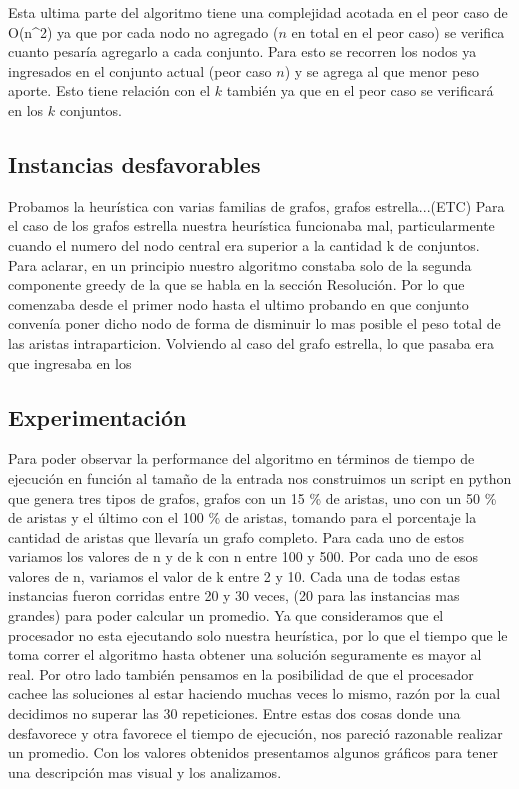Esta ultima parte del algoritmo tiene una complejidad acotada en el peor caso de O(n^2) ya que por cada nodo no agregado ($n$ en total en el peor caso) se verifica cuanto pesaría agregarlo a cada conjunto. Para esto se recorren los nodos ya ingresados en el conjunto actual (peor caso $n$) y se agrega al que menor peso aporte. Esto tiene relación con el $k$ también ya que en el peor caso se verificará en los $k$ conjuntos.

\subsection{Instancias desfavorables}


Probamos la heurística con varias familias de grafos, grafos estrella...(ETC) 
Para el caso de los grafos estrella nuestra heurística funcionaba mal, particularmente cuando el numero del nodo central era superior a la cantidad k de conjuntos. 
Para aclarar, en un principio nuestro algoritmo constaba solo de la segunda componente greedy de la que se habla en la sección Resolución. Por lo que comenzaba desde el primer nodo hasta el ultimo probando en que conjunto convenía poner dicho nodo de forma de disminuir lo mas posible el peso total de las aristas intraparticion. Volviendo al caso del grafo estrella, lo que pasaba era que ingresaba en los

\subsection{Experimentación}

Para poder observar la performance del algoritmo en términos de tiempo de ejecución en función al tamaño de la entrada nos construimos un script en python que genera tres tipos de grafos, grafos con un 15 \% de aristas, uno con un 50 \% de aristas y el último con el 100 \% de aristas, tomando para el porcentaje la cantidad de aristas que llevaría un grafo completo.
Para cada uno de estos variamos los valores de n y de k con n entre 100 y 500. 
Por cada uno de esos valores de n, variamos el valor de k entre 2 y 10.
Cada una de todas estas instancias fueron corridas entre 20 y 30 veces, (20 para las instancias mas grandes) para poder calcular un promedio. Ya que consideramos que el procesador no esta ejecutando solo nuestra heurística, por lo que el tiempo que le toma correr el algoritmo hasta obtener una solución seguramente es mayor al real. Por otro lado también pensamos en la posibilidad de que el procesador cachee las soluciones al estar haciendo muchas veces lo mismo, razón por la cual decidimos no superar las 30 repeticiones. Entre estas dos cosas donde una desfavorece y otra favorece el tiempo de ejecución, nos pareció razonable realizar un promedio.
Con los valores obtenidos presentamos algunos gráficos para tener una descripción mas visual y los analizamos.

